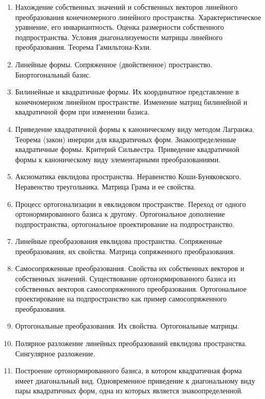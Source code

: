 \begin{enumerate}[leftmargin=*, wide=0pt]
    \item Нахождение собственных значений и собственных векторов линейного преобразования конечномерного линейного пространства. Характеристическое уравнение, его инвариантность. Оценка размерности собственного подпространства. Условия диагонализуемости матрицы линейного преобразования. Теорема Гамильтона-Кэли.
    
    \item Линейные формы. Сопряженное (двойственное) пространство. Биортогональный базис.
    
    \item Билинейные и квадратичные формы. Их координатное представление в конечномерном линейном пространстве. Изменение матриц билинейной и квадратичной форм при изменении базиса.
    
    \item Приведение квадратичной формы к каноническому виду методом Лагранжа. Теорема (закон) инерции для квадратичных форм. Знакоопределенные квадратичные формы. Критерий Сильвестра. Приведение квадратичной формы к каноническому виду элементарными преобразованиями.
    
    \item Аксиоматика евклидова пространства. Неравенство Коши-Буняковского. Неравенство треугольника. Матрица Грама и ее свойства.
    
    \item Процесс ортогонализации в евклидовом пространстве. Переход от одного ортонормированного базиса к другому. Ортогональное дополнение подпространства, ортогональное проектирование на подпространство.
    
    \item Линейные преобразования евклидова пространства. Сопряженные преобразования, их свойства. Матрица сопряженного преобразования.
    
    \item Самосопряженные преобразования. Свойства их собственных векторов и собственных значений. Существование ортонормированного базиса из собственных векторов самосопряженного преобразования. Ортогональное проектирование на подпространство как пример самосопряженного преобразования.
    
    \item Ортогональные преобразования. Их свойства. Ортогональные матрицы.
    
    \item Полярное разложение линейных преобразований евклидова пространства. Сингулярное разложение.
    
    \item Построение ортонормированного базиса, в котором квадратичная форма имеет диагональный вид. Одновременное приведение к диагональному виду пары квадратичных форм, одна из которых является знакоопределенной.
\end{enumerate}